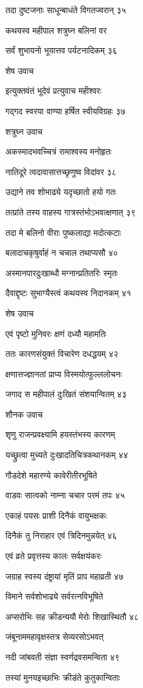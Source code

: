 तदा दुष्टजनाः साधून्बाधंते विगतज्वरान् ३५

कथयस्व महीपाल शत्रुघ्न बलिनां वर

सर्वं शुभायनो भूयात्तव पर्यटनादिकम् ३६

शेष उवाच

इत्युक्तवंतं भूदेवं प्रत्युवाच महीश्वरः

गद्गद स्वरया वाण्या हर्षित स्वीयविग्रहः ३७

शत्रुघ्न उवाच

अकस्मादभवच्चित्रं रामाश्वस्य मनोहृतः

नातिदूरे त्वदावासात्तच्छृणुष्व विदांवर ३८

उद्याने तव शोभाढ्ये यदृच्छातो हयो गतः

तत्प्रांते तस्य वाहस्य गात्रस्तंभोऽभवत्क्षणात् ३९

तदा मे बलिनो वीराः पुष्कलाद्या मदोत्कटाः

बलादाचकृषुर्वाहं न चचाल तथाप्यसौ ४०

अस्मानपारदुःखाब्धौ मग्नान्प्रतितरिः स्मृतः

दैवाद्दृष्टः सुभाग्यैस्त्वं कथयस्व निदानकम् ४१

शेष उवाच

एवं पृष्टो मुनिवरः क्षणं दध्यौ महामतिः

ततः कारणसंयुक्तं विचारेण दधद्धयम् ४२

क्षणात्तज्ज्ञानतां प्राप्य विस्मयोत्फुल्ललोचनः

जगाद स महीपालं दुःखितं संशयान्वितम् ४३

शौनक उवाच

शृणु राजन्प्रवक्ष्यामि हयस्तंभस्य कारणम्

यच्छ्रुत्वा मुच्यते दुःखादतिचित्रकथानकम् ४४

गौडदेशे महारण्ये कावेरीतीरभूषिते

वाडवः सात्वको नाम्ना चचार परमं तपः ४५

एकाहं पयसः प्राशी दिनैकं वायुभक्षकः

दिनैकं तु निराहार एवं त्रिदिनमुन्नयेत् ४६

एवं व्रते प्रवृत्तस्य कालः सर्वक्षयंकरः

जग्राह स्वस्य दंष्ट्रायां मृतिं प्राप महाव्रती ४७

विमाने सर्वशोभाढ्ये सर्वरत्नविभूषिते

अप्सरोभिः सह क्रीडन्ययौ मेरोः शिखास्थितौ ४८

जंबूनाममहावृक्षस्तत्र सेव्यरसोऽभवत्

नदी जांबवती संज्ञा स्वर्णद्रवसमन्विता ४९

तस्यां मुनयइच्छाभिः क्रीडंते कुतुकान्विताः

